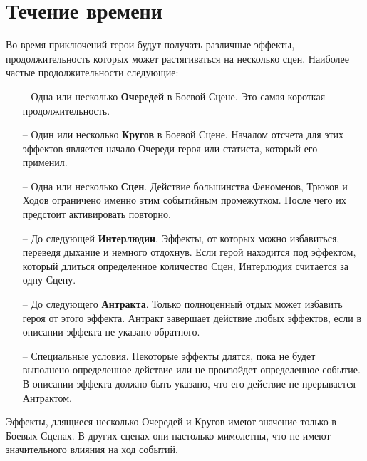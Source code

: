 \section{Течение времени}
Во время приключений герои будут получать различные эффекты, продолжительность которых может растягиваться на несколько сцен. Наиболее частые продолжительности следующие:
\begin{itemize}
\item[--] Одна или несколько \textbf{Очередей} в Боевой Сцене. Это самая короткая продолжительность.
\item[--] Один или несколько \textbf{Кругов} в Боевой Сцене. Началом отсчета для этих эффектов является начало Очереди героя или статиста, который его применил.
\item[--] Одна или несколько \textbf{Сцен}. Действие большинства Феноменов, Трюков и Ходов ограничено именно этим событийным промежутком. После чего их предстоит активировать повторно.
\item[--] До следующей \textbf{Интерлюдии}. Эффекты, от которых можно избавиться, переведя дыхание и немного отдохнув. Если герой находится под эффектом, который длиться определенное количество Сцен, Интерлюдия считается за одну Сцену.
\item[--] До следующего \textbf{Антракта}. Только полноценный отдых может избавить героя от этого эффекта. Антракт завершает действие любых эффектов, если в описании эффекта не указано обратного.
\item[--] Специальные условия. Некоторые эффекты длятся, пока не будет выполнено определенное действие или не произойдет определенное событие. В описании эффекта должно быть указано, что его действие не прерывается Антрактом.
\end{itemize}
\begin{tcolorbox}
Эффекты, длящиеся несколько Очередей и Кругов имеют значение только в Боевых Сценах. В других сценах они настолько мимолетны, что не имеют значительного влияния на ход событий.
\end{tcolorbox}